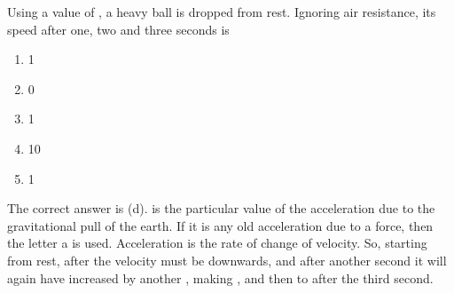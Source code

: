 
\begin{problem}[Robin4]
{Using a value of , a heavy ball is dropped from rest. Ignoring air resistance, its speed after one, two and three seconds is
\begin{enumerate}
	\item 1   
	\item 0   
	\item 1   
	\item 10    \answer
	\item 1   
\end{enumerate}
}
{}
{The correct answer is (d).  is the particular value of the acceleration due to the gravitational pull of the earth. If it is any old acceleration due to a force, then the letter a is used. Acceleration is the rate of change of velocity. So, starting from rest, after  the velocity must be  downwards, and after another second it will again have increased by another , making , and then to  after the third second. }
\end{problem}